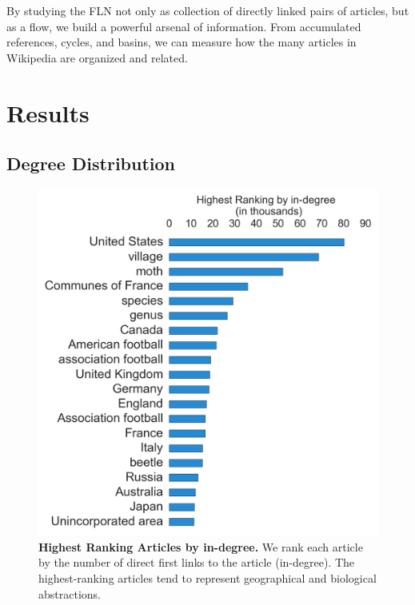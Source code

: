 \documentclass[11pt]{report}
\begin{document}
By studying the FLN not only as collection of directly linked pairs of articles, but
as a flow, 
we build a powerful arsenal of information.
From accumulated references, cycles, and basins, we can measure how the many articles in Wikipedia are organized and related.





\section{Results}

\subsection{Degree Distribution}

\begin{figure}[tp!]
  \includegraphics[width=\columnwidth]{graphics/articles_ndegree.png}
  \caption{
    \textbf{Highest Ranking Articles by in-degree.}
We rank each article by the number of direct first links to the article (in-degree). The highest-ranking articles tend to represent geographical and biological abstractions.}
  \label{fig:indegree list}
\end{figure}
\end{document}
